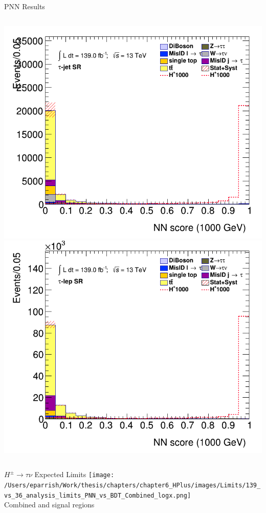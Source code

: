 \documentclass[aspectratio=169,xcolor=table]{beamer}
\begin{document}
\begin{frame}[t]{PNN Results}
\begin{columns}[t]
        \includegraphics[height=.43\textheight,keepaspectratio=true]{clf_score_GB200_mass_1000to1000_SR_TAUJET.png}
        \includegraphics[height=.43\textheight,keepaspectratio=true]{clf_score_GB200_mass_1000to1000_SR_TAULEP.png}
      \end{columns}
    \end{frame}

    \begin{frame}{$H^{\pm} \rightarrow \tau\nu$ Expected Limits}
      \centering
      \texttt{[image: /Users/eparrish/Work/thesis/chapters/chapter6\_HPlus/images/Limits/139\_vs\_36\_analysis\_limits\_PNN\_vs\_BDT\_Combined\_logx.png]} \\
      \centering
      Combined \taujets and \taulep signal regions
    \end{frame}
\end{document}
